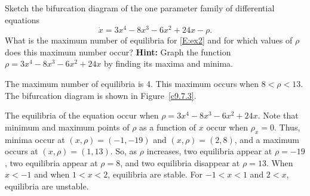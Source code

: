 \documentclass{ximera}
\begin{document}
\begin{exercise} \label{c9.7.3}
Sketch the bifurcation diagram of the one parameter family of differential 
equations
\begin{equation} \label{E:ex2}
\dot{x} = 3x^4 - 8x^3 - 6x^2 + 24x - \rho.
\end{equation}
What is the maximum number of equilibria for \eqref{E:ex2} and for which 
values of $\rho$ does this maximum number occur? {\bf Hint:} Graph the 
function $\rho=3x^4 - 8x^3 - 6x^2 + 24x$ by finding its maxima and minima. 

\begin{solution}

\ans The maximum number of equilibria is 4.  This maximum occurs when
$8 < \rho < 13$.  The bifurcation diagram is shown in Figure~\ref{c9.7.3}.

\soln The equilibria of the equation occur when
$\rho = 3x^4 - 8x^3 - 6x^2 + 24x$.  Note that minimum and maximum points of
$\rho$ as a function of $x$ occur when $\rho_x = 0$.  Thus, minima occur
at $(x,\rho) = (-1,-19)$ and $(x,\rho) = (2,8)$, and a maximum occurs at
$(x,\rho) = (1,13)$.  So, as $\rho$ increases, two equilibria appear at
$\rho = -19$, two equilibria appear at $\rho = 8$, and two equilibria
disappear at $\rho = 13$.  When $x < -1$ and when $1 < x < 2$, equilibria
are stable.  For $-1 < x < 1$ and $2 < x$, equilibria are unstable.

\begin{figure}[htb]
                       \centerline{%
                       }
\end{figure}

\end{solution}
\end{exercise}
\end{document}
